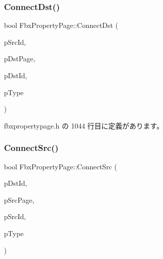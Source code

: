 \subsubsection{\texorpdfstring{Connect\+Dst()}{ConnectDst()}}
{\footnotesize\ttfamily bool Fbx\+Property\+Page\+::\+Connect\+Dst (\begin{DoxyParamCaption}\item[{\hyperlink{fbxtypes_8h_a088fa96de3b0b3ea69f0f6afef525dfb}{Fbx\+Int}}]{p\+Src\+Id,  }\item[{\hyperlink{class_fbx_property_page}{Fbx\+Property\+Page} $\ast$}]{p\+Dst\+Page,  }\item[{\hyperlink{fbxtypes_8h_a088fa96de3b0b3ea69f0f6afef525dfb}{Fbx\+Int}}]{p\+Dst\+Id,  }\item[{\hyperlink{class_fbx_connection_a3df448a5db356652ab99fd2be2553749}{Fbx\+Connection\+::\+E\+Type}}]{p\+Type }\end{DoxyParamCaption})\hspace{0.3cm}{\ttfamily [inline]}}



 fbxpropertypage.\+h の 1044 行目に定義があります。

\mbox{\label{class_fbx_property_page_a8a265cf78b10f6255f3c4796b1b10875}} 
\subsubsection{\texorpdfstring{Connect\+Src()}{ConnectSrc()}}
{\footnotesize\ttfamily bool Fbx\+Property\+Page\+::\+Connect\+Src (\begin{DoxyParamCaption}\item[{\hyperlink{fbxtypes_8h_a088fa96de3b0b3ea69f0f6afef525dfb}{Fbx\+Int}}]{p\+Dst\+Id,  }\item[{\hyperlink{class_fbx_property_page}{Fbx\+Property\+Page} $\ast$}]{p\+Src\+Page,  }\item[{\hyperlink{fbxtypes_8h_a088fa96de3b0b3ea69f0f6afef525dfb}{Fbx\+Int}}]{p\+Src\+Id,  }\item[{\hyperlink{class_fbx_connection_a3df448a5db356652ab99fd2be2553749}{Fbx\+Connection\+::\+E\+Type}}]{p\+Type }\end{DoxyParamCaption})\hspace{0.3cm}{\ttfamily [inline]}}




